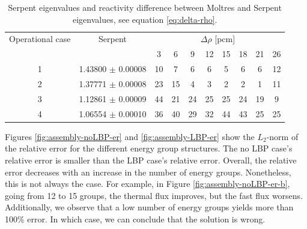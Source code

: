 \begin{table}[htbp!]
  \centering
  \caption{Serpent eigenvalues and reactivity difference between Moltres and Serpent eigenvalues, see equation \ref{eq:delta-rho}. }
  \begin{tabular}{c|c|cccccccc}
  \toprule
Operational case  & Serpent & \multicolumn{8}{c}{$\Delta \rho$ [pcm]}            \\ \cline{3-10} 
                  &         & 3   & 6   & 9   & 12   & 15   & 18   & 21   & 26   \\
  \midrule
1 & 1.43800 $\pm$ 0.00008 & 10  & 7   & 6   & 6    & 5    & 6    & 6    & 12   \\
2 & 1.37771 $\pm$ 0.00008 & 23  & 15  & 4   & 3    & 2    & 2    & 1    & 11   \\
3 & 1.12861 $\pm$ 0.00009 & 44  & 21  & 24  & 25   & 25   & 24   & 19   & 9    \\
4 & 1.06554 $\pm$ 0.00010 & 36  & 40  & 29  & 32   & 44   & 43   & 25   & 25   \\
  \bottomrule
  \end{tabular}
  \label{tab:keff}
\end{table}

Figures \ref{fig:assembly-noLBP-er} and \ref{fig:assembly-LBP-er} show the $L_2$-norm of the relative error for the different energy group structures.
The no LBP case's relative error is smaller than the LBP case's relative error.
Overall, the relative error decreases with an increase in the number of energy groups.
Nonetheless, this is not always the case.
For example, in Figure \ref{fig:assembly-noLBP-er-b}, going from 12 to 15 groups, the thermal flux improves, but the fast flux worsens.
Additionally, we observe that a low number of energy groups yields more than 100$\%$ error.
In which case, we can conclude that the solution is wrong.

